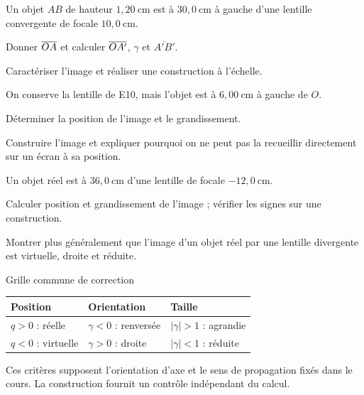 Un objet $AB$ de hauteur $1{,}20\ \mathrm{cm}$ est à $30{,}0\ \mathrm{cm}$ à gauche d'une lentille convergente de focale $10{,}0\ \mathrm{cm}$.
\begin{questions}
\item Donner $\overline{OA}$ et calculer $\overline{OA'}$, $\gamma$ et $\overline{A'B'}$.
\item Caractériser l'image et réaliser une construction à l'échelle.
\end{questions}
On conserve la lentille de E10, mais l'objet est à $6{,}00\ \mathrm{cm}$ à gauche de $O$.
\begin{questions}
\item Déterminer la position de l'image et le grandissement.
\item Construire l'image et expliquer pourquoi on ne peut pas la recueillir directement sur un écran à sa position.
\end{questions}
Un objet réel est à $36{,}0\ \mathrm{cm}$ d'une lentille de focale $-12{,}0\ \mathrm{cm}$.
\begin{questions}
\item Calculer position et grandissement de l'image ; vérifier les signes sur une construction.
\item Montrer plus généralement que l'image d'un objet réel par une lentille divergente est virtuelle, droite et réduite.
\end{questions}
\begin{docu}{Grille commune de correction}
\begin{tabularx}{\linewidth}{@{}Y Y Y@{}}\toprule
Position & Orientation & Taille\\\midrule
$q>0$ : réelle & $\gamma<0$ : renversée & $|\gamma|>1$ : agrandie\\
$q<0$ : virtuelle & $\gamma>0$ : droite & $|\gamma|<1$ : réduite\\\bottomrule
\end{tabularx}
Ces critères supposent l'orientation d'axe et le sens de propagation fixés dans le cours. La construction fournit un contrôle indépendant du calcul.
\end{docu}

